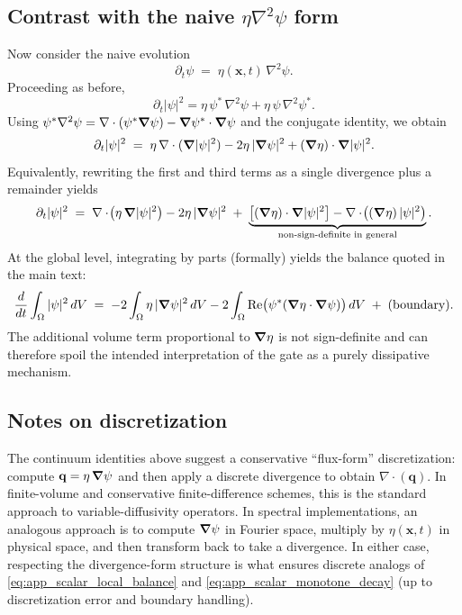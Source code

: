 \documentclass[11pt]{article}
\theoremstyle{plain}
\theoremstyle{definition}
\theoremstyle{remark}
\newcommand{\diver}{\nabla\cdot}
\begin{document}
\subsection{Contrast with the naive $\eta\nabla^2\psi$ form}
Now consider the naive evolution
\begin{equation}\label{eq:app_scalar_naive_pde}
  \partial_t\psi \;=\; \eta(\mathbf{x},t)\,\nabla^2\psi.
\end{equation}
Proceeding as before,
\[
\partial_t|\psi|^2
=
\eta\,\psi^*\,\nabla^2\psi + \eta\,\psi\,\nabla^2\psi^*.
\]
Using $\psi^*\nabla^2\psi=\diver(\psi^*\grad\psi)-\grad\psi^*\cdot\grad\psi$ and the conjugate identity,
we obtain
\begin{equation}\label{eq:app_scalar_naive_local}
  \partial_t|\psi|^2
  \;=\;
  \eta\,\diver(\grad|\psi|^2)
  -2\eta\,|\grad\psi|^2
  + (\grad\eta)\cdot\grad|\psi|^2.
\end{equation}
Equivalently, rewriting the first and third terms as a single divergence plus a remainder yields
\begin{equation}\label{eq:app_scalar_naive_local_alt}
  \partial_t|\psi|^2
  \;=\;
  \diver\!\big(\eta\,\grad|\psi|^2\big)
  -2\eta\,|\grad\psi|^2
  \;+\; \underbrace{\big[(\grad\eta)\cdot\grad|\psi|^2\big] - \diver\!\big((\grad\eta)\,|\psi|^2\big)}_{\text{non-sign-definite in general}}.
\end{equation}
At the global level, integrating by parts (formally) yields the balance quoted in the main text:
\begin{equation}\label{eq:app_scalar_naive_global}
  \frac{d}{dt}\int_{\Omega}|\psi|^2\,dV
  \;=\;
  -2\int_{\Omega}\eta\,|\grad\psi|^2\,dV
  -2\int_{\Omega}\Re\!\big(\psi^*(\grad\eta\cdot\grad\psi)\big)\,dV
  \;+\; \text{(boundary)}.
\end{equation}
The additional volume term proportional to $\grad\eta$ is not sign-definite and can therefore spoil the
intended interpretation of the gate as a purely dissipative mechanism.

\subsection{Notes on discretization}
The continuum identities above suggest a conservative ``flux-form'' discretization:
compute $\mathbf{q}=\eta\,\grad\psi$ and then apply a discrete divergence to obtain
$\diver(\mathbf{q})$. In finite-volume and conservative finite-difference schemes, this is the
standard approach to variable-diffusivity operators. In spectral implementations, an analogous approach
is to compute $\grad\psi$ in Fourier space, multiply by $\eta(\mathbf{x},t)$ in physical space, and then
transform back to take a divergence. In either case, respecting the divergence-form structure is what
ensures discrete analogs of \eqref{eq:app_scalar_local_balance} and \eqref{eq:app_scalar_monotone_decay}
(up to discretization error and boundary handling).
\end{document}

